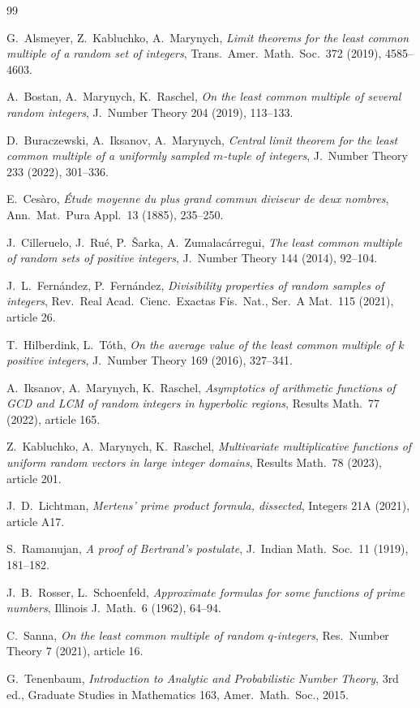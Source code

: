 \documentclass[11pt]{article}
\theoremstyle{remark}
\begin{document}
\begin{thebibliography}{99}

G.~Alsmeyer, Z.~Kabluchko, A.~Marynych, \emph{Limit theorems for the least common multiple of a random set of integers}, Trans.\ Amer.\ Math.\ Soc.\ 372 (2019), 4585--4603.

A.~Bostan, A.~Marynych, K.~Raschel, \emph{On the least common multiple of several random integers}, J.\ Number Theory 204 (2019), 113--133.

D.~Buraczewski, A.~Iksanov, A.~Marynych, \emph{Central limit theorem for the least common multiple of a uniformly sampled $m$-tuple of integers}, J.\ Number Theory 233 (2022), 301--336.

E.~Ces\`aro, \emph{\'Etude moyenne du plus grand commun diviseur de deux nombres}, Ann.\ Mat.\ Pura Appl.\ 13 (1885), 235--250.

J.~Cilleruelo, J.~Ru\'e, P.~\v{S}arka, A.~Zumalac\'arregui, \emph{The least common multiple of random sets of positive integers}, J.\ Number Theory 144 (2014), 92--104.

J.~L.~Fern\'andez, P.~Fern\'andez, \emph{Divisibility properties of random samples of integers}, Rev.\ Real Acad.\ Cienc.\ Exactas F\'is.\ Nat., Ser.\ A Mat.\ 115 (2021), article 26.

T.~Hilberdink, L.~T\'oth, \emph{On the average value of the least common multiple of $k$ positive integers}, J.\ Number Theory 169 (2016), 327--341.

A.~Iksanov, A.~Marynych, K.~Raschel, \emph{Asymptotics of arithmetic functions of GCD and LCM of random integers in hyperbolic regions}, Results Math.\ 77 (2022), article 165.

Z.~Kabluchko, A.~Marynych, K.~Raschel, \emph{Multivariate multiplicative functions of uniform random vectors in large integer domains}, Results Math.\ 78 (2023), article 201.

J.~D.~Lichtman, \emph{Mertens' prime product formula, dissected}, Integers 21A (2021), article A17.

S.~Ramanujan, \emph{A proof of Bertrand's postulate}, J.\ Indian Math.\ Soc.\ 11 (1919), 181--182.

J.~B.~Rosser, L.~Schoenfeld, \emph{Approximate formulas for some functions of prime numbers}, Illinois J.\ Math.\ 6 (1962), 64--94.

C.~Sanna, \emph{On the least common multiple of random $q$-integers}, Res.\ Number Theory 7 (2021), article 16.

G.~Tenenbaum, \emph{Introduction to Analytic and Probabilistic Number Theory}, 3rd ed., Graduate Studies in Mathematics 163, Amer.\ Math.\ Soc., 2015.

\end{thebibliography}
\end{document}
